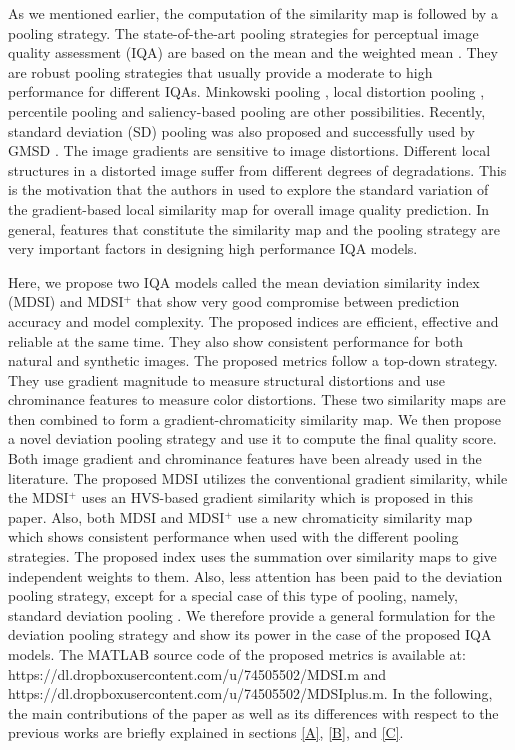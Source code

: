 As we mentioned earlier, the computation of the similarity map is followed by a pooling strategy. The state-of-the-art pooling strategies for perceptual image quality assessment (IQA) are based on the mean and the weighted mean \cite{SSIM, MSSSIM, IWSSIM, GS, FSIM, RFSIM}. They are robust pooling strategies that usually provide a moderate to high performance for different IQAs. Minkowski pooling \cite{spatial2006}, local distortion pooling \cite{spatial2006, pooling2009, MAD}, percentile pooling \cite{percentile2009} and saliency-based pooling \cite{SRSIM, VSI} are other possibilities. Recently, standard deviation (SD) pooling was also proposed and successfully used by GMSD \cite{GMSD}. The image gradients are sensitive to image distortions. Different local structures in a distorted image suffer from different degrees of degradations. This is the motivation
that the authors in \cite{GMSD} used to explore the standard variation
of the gradient-based local similarity map for overall image
quality prediction. In general, features that constitute the similarity map and the pooling strategy are very important factors in designing high performance IQA models. 



Here, we propose two IQA models called the mean deviation similarity index (MDSI) and MDSI$^+$ that show very good compromise between prediction accuracy and model complexity. The proposed indices are efficient, effective and reliable at the same time. They also show consistent performance for both natural and synthetic images. The proposed metrics follow a top-down strategy. They use gradient magnitude to measure structural distortions and use chrominance features to measure color distortions. These two similarity maps are then combined to form a gradient-chromaticity similarity map. We then propose a novel deviation pooling strategy and use it to compute the final quality score. Both image gradient \cite{GSSIM, gradient2010, GS, FSIM, GMSD, VSI} and chrominance features \cite{FSIM, VSI} have been already used in the literature. The proposed MDSI utilizes the conventional gradient similarity, while the MDSI$^+$ uses an HVS-based gradient similarity which is proposed in this paper. Also, both MDSI and MDSI$^+$ use a new chromaticity similarity map which shows consistent performance when used with the different pooling strategies. The proposed index uses the summation over similarity maps to give independent weights to them. Also, less attention has been paid to the deviation pooling strategy, except for a special case of this type of pooling, namely, standard deviation pooling \cite{GMSD}. We therefore provide a general formulation for the deviation pooling strategy and show its power in the case of the proposed IQA models. The MATLAB source code of the proposed metrics is available at: https://dl.dropboxusercontent.com/u/74505502/MDSI.m and https://dl.dropboxusercontent.com/u/74505502/MDSIplus.m. In the following, the main contributions of the paper as well as its differences with respect to the previous works are briefly explained in sections \ref{A}, \ref{B}, and \ref{C}. 

